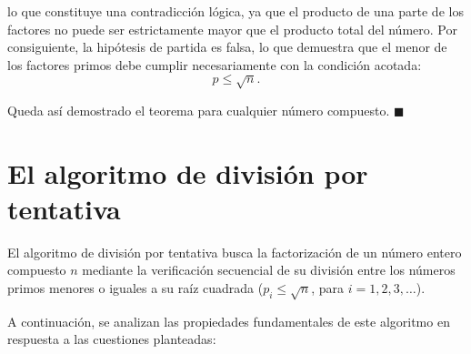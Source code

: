 \documentclass[11pt,a4paper,spanish]{book}
\begin{document}
lo que constituye una contradicción lógica, ya que el producto de una parte de los factores no puede ser estrictamente mayor que el producto total del número. Por consiguiente, la hipótesis de partida es falsa, lo que demuestra que el menor de los factores primos debe cumplir necesariamente con la condición acotada:
$$p \leq \sqrt{n}.$$

Queda así demostrado el teorema para cualquier número compuesto. $\blacksquare$

\section{El algoritmo de división por tentativa} \label{division}

El algoritmo de división por tentativa busca la factorización de un número entero compuesto $n$ mediante la verificación secuencial de su división entre los números primos menores o iguales a su raíz cuadrada ($p_i \leq \sqrt{n}$, para $i = 1, 2, 3, \dots$). 

A continuación, se analizan las propiedades fundamentales de este algoritmo en respuesta a las cuestiones planteadas:
\end{document}
